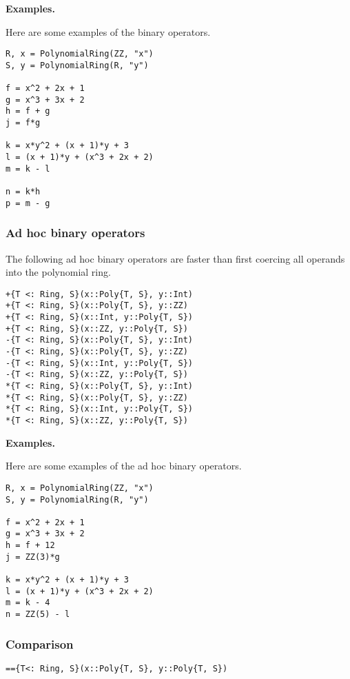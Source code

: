 \documentclass[a4paper,10pt]{article}
\begin{document}
{{{\textbf{Examples.}

Here are some examples of the binary operators.

\begin{lstlisting}
R, x = PolynomialRing(ZZ, "x")
S, y = PolynomialRing(R, "y")

f = x^2 + 2x + 1
g = x^3 + 3x + 2
h = f + g
j = f*g

k = x*y^2 + (x + 1)*y + 3
l = (x + 1)*y + (x^3 + 2x + 2)
m = k - l

n = k*h
p = m - g
\end{lstlisting}

\subsubsection{Ad hoc binary operators}

The following ad hoc binary operators are faster than first coercing all
operands into the polynomial ring.

\begin{lstlisting}
+{T <: Ring, S}(x::Poly{T, S}, y::Int)
+{T <: Ring, S}(x::Poly{T, S}, y::ZZ)
+{T <: Ring, S}(x::Int, y::Poly{T, S})
+{T <: Ring, S}(x::ZZ, y::Poly{T, S})
-{T <: Ring, S}(x::Poly{T, S}, y::Int)
-{T <: Ring, S}(x::Poly{T, S}, y::ZZ)
-{T <: Ring, S}(x::Int, y::Poly{T, S})
-{T <: Ring, S}(x::ZZ, y::Poly{T, S})
*{T <: Ring, S}(x::Poly{T, S}, y::Int)
*{T <: Ring, S}(x::Poly{T, S}, y::ZZ)
*{T <: Ring, S}(x::Int, y::Poly{T, S})
*{T <: Ring, S}(x::ZZ, y::Poly{T, S})
\end{lstlisting}

\textbf{Examples.}

Here are some examples of the ad hoc binary operators.

\begin{lstlisting}
R, x = PolynomialRing(ZZ, "x")
S, y = PolynomialRing(R, "y")

f = x^2 + 2x + 1
g = x^3 + 3x + 2
h = f + 12
j = ZZ(3)*g

k = x*y^2 + (x + 1)*y + 3
l = (x + 1)*y + (x^3 + 2x + 2)
m = k - 4
n = ZZ(5) - l
\end{lstlisting}

\subsubsection{Comparison}

\begin{lstlisting}
=={T<: Ring, S}(x::Poly{T, S}, y::Poly{T, S})
\end{lstlisting}

}}}
\end{document}
